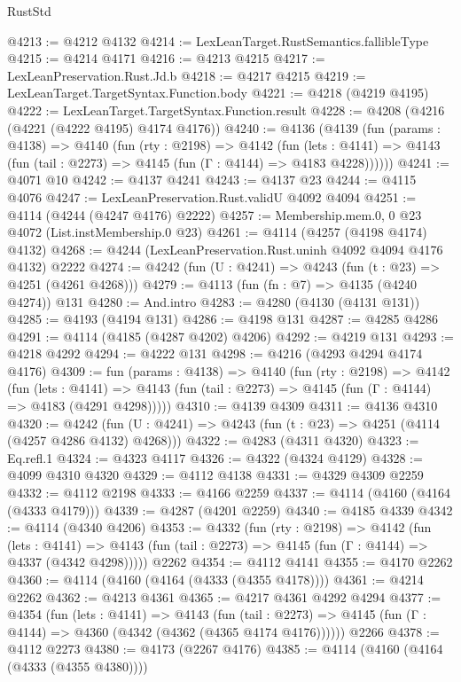 \begin{lexlean}{RustStd}
\begin{coremodule}
@4213 := @4212 @4132
@4214 := LexLeanTarget.RustSemantics.fallibleType
@4215 := @4214 @4171
@4216 := @4213 @4215
@4217 := LexLeanPreservation.Rust.Jd.b
@4218 := @4217 @4215
@4219 := LexLeanTarget.TargetSyntax.Function.body
@4221 := @4218 (@4219 @4195)
@4222 := LexLeanTarget.TargetSyntax.Function.result
@4228 := @4208 (@4216 (@4221 (@4222 @4195) @4174 @4176))
@4240 := @4136
    (@4139
      (fun (params : @4138) =>
      @4140
        (fun (rty : @2198) =>
        @4142
          (fun (lets : @4141) =>
          @4143 (fun (tail : @2273) => @4145 (fun (Γ : @4144) => @4183 @4228))))))
@4241 := @4071 @10
@4242 := @4137 @4241
@4243 := @4137 @23
@4244 := @4115 @4076
@4247 := LexLeanPreservation.Rust.validU @4092 @4094
@4251 := @4114 (@4244 (@4247 @4176) @2222)
@4257 := Membership.mem.{0, 0} @23 @4072 (List.instMembership.{0} @23)
@4261 := @4114 (@4257 (@4198 @4174) @4132)
@4268 := @4244 (LexLeanPreservation.Rust.uninh @4092 @4094 @4176 @4132) @2222
@4274 := @4242 (fun (U : @4241) => @4243 (fun (t : @23) => @4251 (@4261 @4268)))
@4279 := @4113 (fun (fn : @7) => @4135 (@4240 @4274)) @131
@4280 := And.intro
@4283 := @4280 (@4130 (@4131 @131))
@4285 := @4193 (@4194 @131)
@4286 := @4198 @131
@4287 := @4285 @4286
@4291 := @4114 (@4185 (@4287 @4202) @4206)
@4292 := @4219 @131
@4293 := @4218 @4292
@4294 := @4222 @131
@4298 := @4216 (@4293 @4294 @4174 @4176)
@4309 := fun (params : @4138) =>
  @4140
    (fun (rty : @2198) =>
    @4142
      (fun (lets : @4141) =>
      @4143 (fun (tail : @2273) => @4145 (fun (Γ : @4144) => @4183 (@4291 @4298)))))
@4310 := @4139 @4309
@4311 := @4136 @4310
@4320 := @4242 (fun (U : @4241) => @4243 (fun (t : @23) => @4251 (@4114 (@4257 @4286 @4132) @4268)))
@4322 := @4283 (@4311 @4320)
@4323 := Eq.refl.{1}
@4324 := @4323 @4117
@4326 := @4322 (@4324 @4129)
@4328 := @4099 @4310 @4320
@4329 := @4112 @4138
@4331 := @4329 @4309 @2259
@4332 := @4112 @2198
@4333 := @4166 @2259
@4337 := @4114 (@4160 (@4164 (@4333 @4179)))
@4339 := @4287 (@4201 @2259)
@4340 := @4185 @4339
@4342 := @4114 (@4340 @4206)
@4353 := @4332
    (fun (rty : @2198) =>
    @4142
      (fun (lets : @4141) =>
      @4143 (fun (tail : @2273) => @4145 (fun (Γ : @4144) => @4337 (@4342 @4298)))))
    @2262
@4354 := @4112 @4141
@4355 := @4170 @2262
@4360 := @4114 (@4160 (@4164 (@4333 (@4355 @4178))))
@4361 := @4214 @2262
@4362 := @4213 @4361
@4365 := @4217 @4361 @4292 @4294
@4377 := @4354
    (fun (lets : @4141) =>
    @4143
      (fun (tail : @2273) => @4145 (fun (Γ : @4144) => @4360 (@4342 (@4362 (@4365 @4174 @4176))))))
    @2266
@4378 := @4112 @2273
@4380 := @4173 (@2267 @4176)
@4385 := @4114 (@4160 (@4164 (@4333 (@4355 @4380))))

\end{coremodule}
\end{lexlean}
